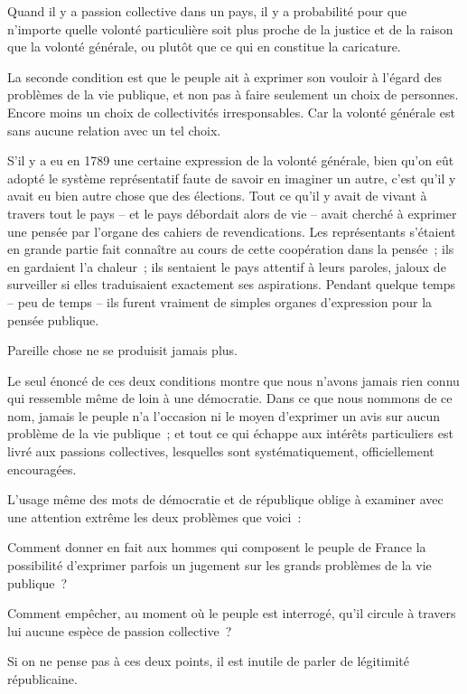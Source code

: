 \documentclass[french,twoside]{book} %
\begin{document}
Quand il y a passion collective dans un pays, il y a probabilité pour que n’importe quelle volonté particulière soit plus proche de la justice et de la raison que la volonté générale, ou plutôt que ce qui en constitue la caricature.\par
La seconde condition est que le peuple ait à exprimer son vouloir à l’égard des problèmes de la vie publique, et non pas à faire seulement un choix de personnes. Encore moins un choix de collectivités irresponsables. Car la volonté générale est sans aucune relation avec un tel choix.\par
S’il y a eu en 1789 une certaine expression de la volonté générale, bien qu’on eût adopté le système représentatif faute de savoir en imaginer un autre, c’est qu’il y avait eu bien autre chose que des élections. Tout ce qu’il y avait de vivant à travers tout le pays – et le pays débordait alors de vie – avait cherché à exprimer une pensée par l’organe des cahiers de revendications. Les représentants s’étaient en grande partie fait connaître au cours de cette coopération dans la pensée ; ils en gardaient l’a chaleur ; ils sentaient le pays attentif à leurs paroles, jaloux de surveiller si elles traduisaient exactement ses aspirations. Pendant quelque temps – peu de temps – ils furent vraiment de simples organes d’expression pour la pensée publique.\par
Pareille chose ne se produisit jamais plus.\par
Le seul énoncé de ces deux conditions montre que nous n’avons jamais rien connu qui ressemble même de loin à une démocratie. Dans ce que nous nommons de ce nom, jamais le peuple n’a l’occasion ni le moyen d’exprimer un avis sur aucun problème de la vie publique ; et tout ce qui échappe aux intérêts particuliers est livré aux passions collectives, lesquelles sont systématiquement, officiellement encouragées.\par
L’usage même des mots de démocratie et de république oblige à examiner avec une attention extrême les deux problèmes que voici :\par
Comment donner en fait aux hommes qui composent le peuple de France la possibilité d’exprimer parfois un jugement sur les grands problèmes de la vie publique ?\par
Comment empêcher, au moment où le peuple est interrogé, qu’il circule à travers lui aucune espèce de passion collective ?\par
Si on ne pense pas à ces deux points, il est inutile de parler de légitimité républicaine.\par
\end{document}
